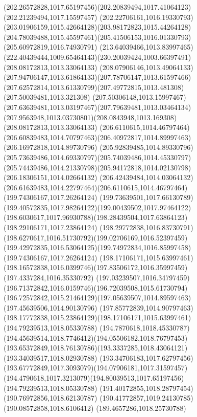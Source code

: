 {{	\curveto(202.26572828,1017.65197456)(202.20839494,1017.41064123)(202.21239494,1017.15597457)
	\curveto(202.22706161,1016.19330793)(203.01906159,1015.42664128)(203.98172823,1015.44264128)
	\curveto(204.78039488,1015.45597461)(205.41506153,1016.01330793)(205.60972819,1016.74930791)
	\curveto(213.64039466,1013.83997465)(222.40439444,1009.65464143)(230.20039424,1003.66397491)
	\moveto(208.08172813,1013.33064133)
	\curveto(208.07906146,1013.49064133)(207.94706147,1013.61864133)(207.78706147,1013.61597466)
	\curveto(207.62572814,1013.61330799)(207.49772815,1013.481308)(207.50039481,1013.321308)
	\curveto(207.50306148,1013.15997467)(207.63639481,1013.03197467)(207.79639481,1013.03464134)
	\curveto(207.9563948,1013.03730801)(208.0843948,1013.169308)(208.08172813,1013.33064133)
	\moveto(206.6110615,1014.46797464)
	\curveto(206.60839483,1014.70797463)(206.40972817,1014.89997463)(206.16972818,1014.89730796)
	\curveto(205.92839485,1014.89330796)(205.73639486,1014.69330797)(205.74039486,1014.45330797)
	\curveto(205.74439486,1014.21330798)(205.94172818,1014.02130798)(206.18306151,1014.02664132)
	\curveto(206.42439484,1014.03064132)(206.61639483,1014.22797464)(206.6110615,1014.46797464)
	\moveto(199.74306167,1017.26264124)
	\curveto(199.73639501,1017.66130789)(199.40572835,1017.98264122)(199.00439502,1017.97464122)
	\curveto(198.6030617,1017.96930788)(198.28439504,1017.63864123)(198.29106171,1017.23864124)
	\curveto(198.29772838,1016.83730791)(198.6270617,1016.51730792)(199.02706169,1016.52397459)
	\curveto(199.42972835,1016.53064125)(199.74972834,1016.85997458)(199.74306167,1017.26264124)
	\moveto(198.17106171,1015.63997461)
	\curveto(198.16572838,1016.0399746)(197.83506172,1016.35997459)(197.4337284,1016.35330792)
	\curveto(197.03239507,1016.34797459)(196.71372842,1016.0159746)(196.72039508,1015.61730794)
	\curveto(196.72572842,1015.21464129)(197.05639507,1014.89597463)(197.45639506,1014.90130796)
	\curveto(197.85772839,1014.90797463)(198.17772838,1015.23864129)(198.17106171,1015.63997461)
	\moveto(194.79239513,1018.05330788)
	\curveto(194.7870618,1018.45330787)(194.45639514,1018.7746412)(194.05506182,1018.76797453)
	\curveto(193.65372849,1018.76130786)(193.3337285,1018.43064121)(193.34039517,1018.02930788)
	\curveto(193.34706183,1017.62797456)(193.67772849,1017.3093079)(194.07906181,1017.31597457)
	\curveto(194.4790618,1017.3213079)(194.80039513,1017.65197456)(194.79239513,1018.05330788)
	\moveto(191.40172855,1018.28797454)
	\lineto(190.76972856,1018.62130787)
	\lineto(190.41772857,1019.24130785)
	\lineto(190.08572858,1018.6106412)
	\lineto(189.4657286,1018.25730788)
}}
